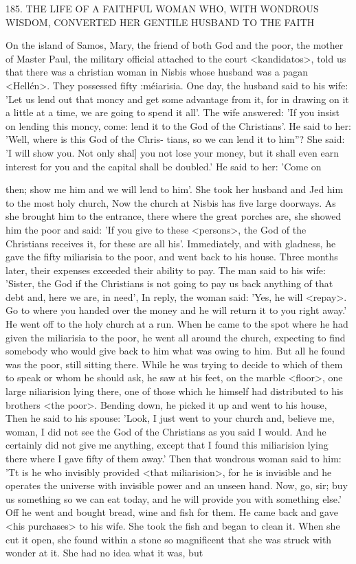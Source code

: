 185. THE LIFE OF A FAITHFUL WOMAN WHO, WITH
WONDROUS WISDOM, CONVERTED HER GENTILE
HUSBAND TO THE FAITH

On the island of Samos, Mary, the friend of both God and the
poor, the mother of Master Paul, the military official attached to
the court <kandidatos>, told us that there was a christian woman
in Nisbis whose husband was a pagan <Hellén>. They possessed
fifty :méiarisia. One day, the husband said to his wife: 'Let us lend
out that moncy and get some advantage from it, for in drawing on
it a little at a time, we are going to spend it all'. The wife answered:
'If you insist on lending this moncy, come: lend it to the God of the
Christians'. He said to her: 'Well, where is this God of the Chris-
tians, so we can lend it to him”? She said: 'I will show you. Not only
shal] you not lose your money, but it shall even earn interest for
you and the capital shall be doubled.' He said to her: 'Come on

then; show me him and we will lend to him'. She took her husband
and Jed him to the most holy church, Now the church at Nisbis has
five large doorways. As she brought him to the entrance, there
where the great porches are, she showed him the poor and said: 'If
you give to these <persons>, the God of the Christians receives it,
for these are all his'. Immediately, and with gladness, he gave the
fifty miliarisia to the poor, and went back to his house. Three
months later, their expenses exceeded their ability to pay. The man
said to his wife: 'Sister, the God if the Christians is not going to pay
us back anything of that debt and, here we are, in need', In reply,
the woman said: 'Yes, he will <repay>. Go to where you handed
over the money and he will return it to you right away.' He went off
to the holy church at a run. When he came to the spot where he
had given the miliarisia to the poor, he went all around the church,
expecting to find somebody who would give back to him what was
owing to him. But all he found was the poor, still sitting there.
While he was trying to decide to which of them to speak or whom
he should ask, he saw at his feet, on the marble <floor>, one large
niliarision lying there, one of those which he himself had distributed
to his brothers <the poor>. Bending down, he picked it up and
went to his house, Then he said to his spouse: 'Look, I just went to
your church and, believe me, woman, I did not see the God of the
Christians as you said I would. And he certainly did not give me
anything, except that I found this miliarision lying there where I
gave fifty of them away.' Then that wondrous woman said to him:
'Tt is he who invisibly provided <that miliarision>, for he is invisible
and he operates the universe with invisible power and an unseen
hand. Now, go, sir; buy us something so we can eat today, and he
will provide you with something else.' Off he went and bought
bread, wine and fish for them. He came back and gave <his
purchases> to his wife. She took the fish and began to clean it.
When she cut it open, she found within a stone so magnificent that
she was struck with wonder at it. She had no idea what it was, but

